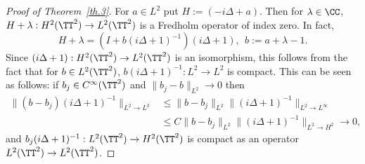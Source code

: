 \begin{proof}[Proof of Theorem~\ref{th.3}]
For $a \in L^2$ put $H := (- i \Delta +a)$. Then for $ \lambda \in \CC $, $ H + \lambda : H^2 (\TT^2) \to L^2 (\TT^2) $ is a Fredholm operator of index zero. In fact,
\[
H + \lambda = (I + b (i \Delta + 1)^{-1}) (i \Delta + 1), \ \ b:= a + \lambda - 1.
\]
Since $ (i \Delta + 1) :H^2 (\TT^2) \to L^2 (\TT^2) $ is an isomorphism, this follows from the fact that for $ b \in L^2 (\TT^2) $, $ b (i \Delta + 1)^{-1} : L^2 \to L^2 $ is compact. This can be seen as follows: if $ b_j \in C^\infty (\TT^2) $ and $ \| b_j - b\|_{L^2 } \to 0 $ then
\[
\begin{split} \| (b - b_j) (i \Delta +1)^{-1} \|_{ L^2 \to L^2 } & \leq
\| b - b_j \|_{ L^2 } \| (i \Delta + 1)^{-1} \|_{ L^2 \to L^\infty } \\
&
\leq C \| b - b_j \|_{ L^2 } \| (i \Delta + 1)^{-1} \|_{ L^2 \to H^2 }
\to 0,
\end{split}
\]
and $ b_j (i \Delta + 1)^{-1} : L^2 (\TT^2) \to H^2 (\TT^2) $ is compact as an operator $ L^2 (\TT^2)\to L^2 (\TT^2) $.



\end{proof}
